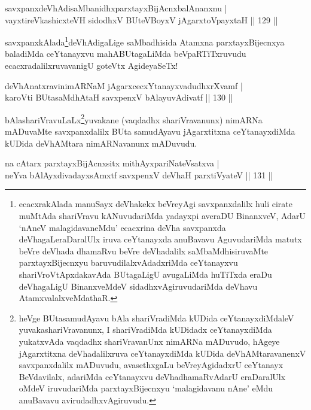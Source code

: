 \begin{shl}
savxpanxdeVhAdisaMbanidhxparxtayxBijAcnxbalAnanxnu | \\
vayxtireVkashicxteVH sidodhxV BUteVBoyxV jAgarxtoV\s payxtaH \hfill||  129 ||  
\end{shl}

\begin{artha}
savxpanxkAlada\footnote{ecacxrakAlada manuSayx deVhakekx beVreyAgi savxpanxdalilx huli cirate muMtAda shariVravu kANuvudariMda yadayxpi  averaDU BinanxveV, AdarU `nAneV malagidavaneMdu' ecacxrina deVha savxpanxda deVhagaLeraDaralUlx iruva ceYtanayxda anuBavavu AguvudariMda matutx beVre deVhada dhamaRvu beVre deVhadalilx saMbaMdhisiruvaMte parxtayxBijecnxyu baruvudilalxvAdadxriMda ceYtanayxvu shariVroVtApxdakavAda BUtagaLigU avugaLiMda huTiTxda eraDu deVhagaLigU BinanxveMdeV sidadhxvAgiruvudariMda deVhavu AtamxvalalxveMdathaR.}deVhAdigaLige saMbadhisida Atamxna parxtayxBijecnxya baladiMda ceYtanayxvu mahABUtagaLiMda beVpaRTiTxruvudu ecacxradalilxruvavanigU goteVtx AgideyaSeTx!
\end{artha}


\begin{shl}
deVhAnatxravinimARNaM jAgarxcecxYtanayxvadudhxrXvamf | \\
karoVti BUtasaMdhAtaH savxpenxV bAlayuvAdivatf \hfill||  130 ||  
\end{shl}

\begin{artha}
bAlashariVravuLaLx\footnote{heVge BUtasamudAyavu bAla shariVradiMda kUDida ceYtanayxdiMdaleV yuvakashariVravanunx, I shariVradiMda kUDidadx ceYtanayxdiMda yukatxvAda vaqdadhx shariVravanUnx nimARNa mADuvudo, hAgeye jAgarxtitxna deVhadalilxruva ceYtanayxdiMda kUDida deVhAMtaravanenxV savxpanxdalilx mADuvudu, avasethxgaLu beVreyAgidadxrU ceYtanayx BeVdavilalx, adariMda ceYtanayxvu deVhadhamaRvAdarU eraDaralUlx oMdeV iruvudariMda parxtayxBijecnxyu `malagidavanu nAne' eMdu anuBavavu avirudadhxvAgiruvudu.}yuvakane (vaqdadhx shariVravanunx) nimARNa mADuvaMte savxpanxdalilx BUta samudAyavu jAgarxtitxna ceYtanayxdiMda kUDida deVhAMtara nimARNavanunx mADuvudu.
\end{artha}

\begin{shl}
na cAtarx parxtayxBijAcnx\s sitx \footnotemark[1]{}mithAyxpariNateVsatxva | \\
neYva bAlAyxdivadayxsAmxtf \footnotemark[2]{}savxpenxV deVhaH parxtiVyateV \hfill||  131 ||  
\end{shl}

